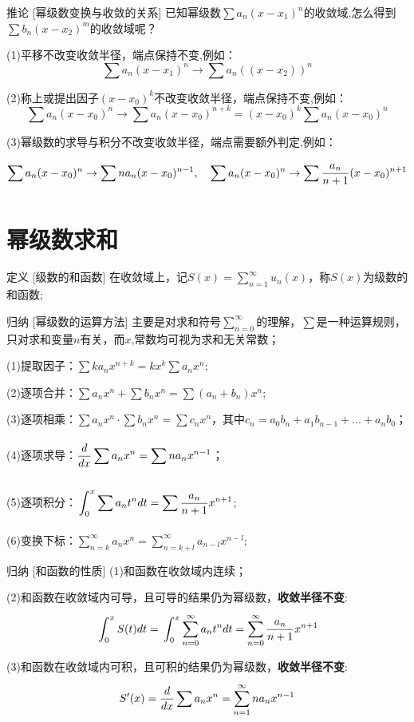 \documentclass[a4paper,12pt,oneside,fontset=none]{ctexbook}
\let\olddfrac\dfrac
\renewcommand{\dfrac}[2]{
    \olddfrac{#1\vrule width 0pt height 1.15em depth 0em}{#2\vrule width 0pt height 0em depth 0.6em}
}
\let\oldint\int
\renewcommand{\int}{\displaystyle{\vrule width 0pt height 0em depth 0em}\oldint}
\let\oldsum\sum
\renewcommand{\sum}{\displaystyle\oldsum}
\newenvironment{corollary}[1][]{\begin{thmBox}{推论}{#1}}{\end{thmBox}}
\newenvironment{induction}[1][]{\begin{thmBox}{归纳}{#1}}{\end{thmBox}}
\newcounter{definition}[chapter]
\newenvironment{definition}[1][]{\begin{defBox}{定义}{#1}}{\end{defBox}}
\numberwithin{equation}{chapter}
\begin{document}
\begin{corollary}
    [幂级数变换与收敛的关系]
    已知幂级数$\sum a_n(x-x_1)^n$的收敛域,怎么得到$\sum b_n(x-x_2)^m$的收敛域呢？

    (1)平移不改变收敛半径，端点保持不变,例如：$$\sum a_n(x-x_1)^n \rightarrow \sum a_n((x-x_2))^n$$

    (2)称上或提出因子$(x-x_0)^k$不改变收敛半径，端点保持不变,例如：$$\sum a_n(x-x_0)^n \rightarrow \sum a_n(x-x_0)^{n+k} = (x-x_0)^k\sum a_n(x-x_0)^n$$

    (3)幂级数的求导与积分不改变收敛半径，端点需要额外判定,例如：$$\sum a_n(x-x_0)^n \rightarrow \sum na_n(x-x_0)^{n-1}, \quad \sum a_n(x-x_0)^n \rightarrow \sum \dfrac{a_n}{n+1}(x-x_0)^{n+1}$$
\end{corollary}


\section{幂级数求和}
\begin{definition}
    [级数的和函数]
    在收敛域上，记$S(x) = \sum_{n=1}^{\infty} u_n(x)，$称$S(x)$为级数的和函数;
\end{definition}

\begin{induction}
    [幂级数的运算方法]
    主要是对求和符号$\sum_{n=0}^{\infty}$的理解，$\sum$是一种运算规则，只对求和变量$n$有关，而$x$,常数均可视为求和无关常数；

    (1)提取因子：$\sum ka_n x^{n+k} = kx^k\sum a_n x^{n};$

    (2)逐项合并：$\sum a_n x^n + \sum b_n x^n = \sum (a_n + b_n)x^n$;

    (3)逐项相乘：$\sum a_n x^n \cdot \sum b_n x^n = \sum c_n x^n$，其中$c_n = a_0b_n + a_1b_{n-1} + ... + a_nb_0$；

    (4)逐项求导：$\dfrac{d}{dx}\sum a_n x^n = \sum na_n x^{n-1}$；

    (5)逐项积分：$\int_{0}^{x} \sum a_n t^n dt = \sum \dfrac{a_n}{n+1}x^{n+1}$;

    (6)变换下标：$\sum_{n=k}^{\infty} a_n x^n = \sum_{n=k+l}^{\infty} a_{n-l} x^{n-l}$;
\end{induction}

\begin{induction}
    [和函数的性质]
    (1)和函数在收敛域内连续；

    (2)和函数在收敛域内可导，且可导的结果仍为幂级数，\textbf{收敛半径不变}:
    $$\int_{0}^{x}S(t)dt = \int_{0}^{x}\sum_{n=0}^{\infty} a_n t^n dt = \sum_{n=0}^{\infty} \dfrac{a_n}{n+1}x^{n+1}$$

    (3)和函数在收敛域内可积，且可积的结果仍为幂级数，\textbf{收敛半径不变}:
    $$S'(x) = \dfrac{d}{dx}\sum a_n x^n = \sum_{n=1}^{\infty} na_n x^{n-1}$$
\end{induction}
\end{document}
